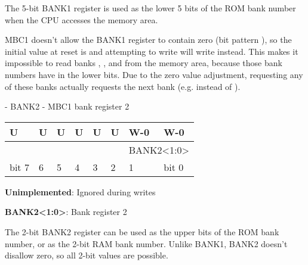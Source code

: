 The 5-bit BANK1 register is used as the lower 5 bits of the ROM bank number
when the CPU accesses the  memory area.

MBC1 doesn't allow the BANK1 register to contain zero (bit pattern
), so the initial value at reset is  and attempting to
write  will write  instead. This makes it impossible to
read banks , ,  and  from the
 memory area, because those bank numbers have 
in the lower bits. Due to the zero value adjustment, requesting any of these
banks actually requests the next bank (e.g.   instead of ).

\begin{register}[H]
  \caption{ - BANK2 - MBC1 bank register 2}

  {
    \ttfamily
    \begin{tabularx}{\textwidth}{|X|X|X|X|X|X|X|X|}
      \hline
      U                     & U                     & U                     & U                     & U                     & U                     & W-0                                  & W-0   \\
      \hline
      \cellcolor{LightGray} & \cellcolor{LightGray} & \cellcolor{LightGray} & \cellcolor{LightGray} & \cellcolor{LightGray} & \cellcolor{LightGray} & \multicolumn{2}{c|}{BANK2<1:0>} \\
      \hline
      bit 7                 & 6                     & 5                     & 4                     & 3                     & 2                     & 1                                    & bit 0 \\
      \hline
    \end{tabularx}
  }

  \begin{description}[leftmargin=5em, style=nextline]
    \item[bit 7-2]
      \textbf{Unimplemented}: Ignored during writes
    \item[bit 1-0]
      \textbf{BANK2<1:0>}: Bank register 2
  \end{description}
\end{register}

The 2-bit BANK2 register can be used as the upper bits of the ROM bank number,
or as the 2-bit RAM bank number. Unlike BANK1, BANK2 doesn't disallow zero, so
all 2-bit values are possible.

